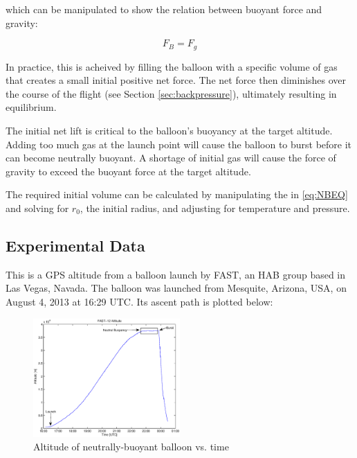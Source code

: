 \documentclass[usenatbib]{mn2e}
\begin{document}
which can be manipulated to show the relation between buoyant force and gravity:

\begin{equation} \label{eq:NBEQ}
	F_B = F_g
\end{equation}

In practice, this is acheived by filling the balloon with a specific volume of gas that creates a small initial positive net force. The net force then diminishes over the course of the flight (see Section \ref{sec:backpressure}), ultimately resulting in equilibrium.

The initial net lift is critical to the balloon's buoyancy at the target altitude. Adding too much gas at the launch point will cause the balloon to burst before it can become neutrally buoyant. A shortage of initial gas will cause the force of gravity to exceed the buoyant force at the target altitude.

The required initial volume can be calculated by manipulating the in \ref{eq:NBEQ} and solving for $r_0$, the initial radius, and adjusting for temperature and pressure.

\subsection{Experimental Data}

This is a GPS altitude from a balloon launch by FAST, an HAB group based in Las Vegas, Navada. The balloon was launched from Mesquite, Arizona, USA, on August 4, 2013 at 16:29 UTC.
Its ascent path is plotted below:

\begin{figure}
\begin{center}
  \includegraphics[width=0.5\textwidth]{altitude.eps}
  \caption{Altitude of neutrally-buoyant balloon vs. time}
\end{center}
\end{figure}



\label{lastpage}

\end{document}
